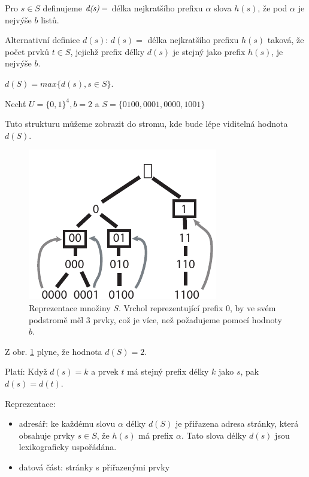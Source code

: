 \begin{defn}
Pro $s \in S$ definujeme $\emph{d(s)} =$ délka nejkratšího prefixu $\alpha$ 
slova $h(s)$, že pod $\alpha$ je nejvýše $b$ listů.
\end{defn}

\begin{pozn}
Alternativní definice $d(s)$: $d(s) =$ délka nejkratšího prefixu $h(s)$
taková, že počet prvků $t \in S$, jejichž prefix délky $d(s)$ je stejný
jako prefix $h(s)$, je nejvýše $b$.
\end{pozn}

\begin{defn}
$d(S) = max\{d(s), s \in S\}$.
\end{defn}

\begin{priklad}
\label{priklad:exthash.tree}
Nechť $U = \{0,1\}^4, b = 2$ a
$S = \{ 0100, 0001, 0000, 1001 \}$

Tuto strukturu můžeme zobrazit do stromu, 
kde bude lépe viditelná hodnota $d(S)$.

\begin{figure}[!htb]
\centering\includegraphics{pics/exthash-tree}
\caption{Reprezentace množiny $S$. Vrchol reprezentující prefix $0$, by ve
svém podstromě měl 3 prvky, což je více, než požadujeme pomocí hodnoty
$b$.}
\label{fig.hash.extern}
\end{figure}

Z obr. \ref{fig.hash.extern} plyne, že hodnota $d(S) = 2$.
\end{priklad}

\begin{tvrzeni}
Platí: Když $d(s) = k$ a prvek $t$ má stejný prefix délky $k$ jako $s$, 
pak $d(s) = d(t)$. 
\end{tvrzeni}

Reprezentace: 
\begin{itemize}
\item adresář: ke každému slovu $\alpha$ délky $d(S)$ je přiřazena adresa 
stránky, která obsahuje prvky $s \in S$, že $h(s)$ má prefix $\alpha$.
Tato slova délky $d(s)$ jsou lexikograficky uspořádána.
\item datová část: stránky s přiřazenými prvky
\end{itemize}

